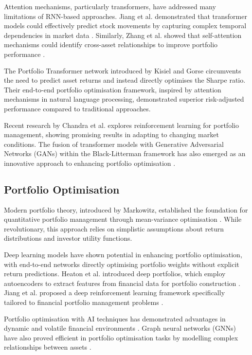 \documentclass[conference]{IEEEtran}
\begin{document}
Attention mechanisms, particularly transformers, have addressed many limitations of RNN-based approaches. Jiang et al. demonstrated that transformer models could effectively predict stock movements by capturing complex temporal dependencies in market data \cite{jiang2021stock}. Similarly, Zhang et al. showed that self-attention mechanisms could identify cross-asset relationships to improve portfolio performance \cite{zhang2018improving}.

The Portfolio Transformer network introduced by Kisiel and Gorse \cite{kisiel2023portfolio} circumvents the need to predict asset returns and instead directly optimises the Sharpe ratio. Their end-to-end portfolio optimisation framework, inspired by attention mechanisms in natural language processing, demonstrated superior risk-adjusted performance compared to traditional approaches.

Recent research by Chandra et al. \cite{chandra2023reinforcement} explores reinforcement learning for portfolio management, showing promising results in adapting to changing market conditions. The fusion of transformer models with Generative Adversarial Networks (GANs) within the Black-Litterman framework has also emerged as an innovative approach to enhancing portfolio optimisation \cite{agarwal2022enhancing}.

\subsection{Portfolio Optimisation}
Modern portfolio theory, introduced by Markowitz, established the foundation for quantitative portfolio management through mean-variance optimisation \cite{markowitz1952portfolio}. While revolutionary, this approach relies on simplistic assumptions about return distributions and investor utility functions.

Deep learning models have shown potential in enhancing portfolio optimisation, with end-to-end networks directly optimising portfolio weights without explicit return predictions. Heaton et al. introduced deep portfolios, which employ autoencoders to extract features from financial data for portfolio construction \cite{heaton2017deep}. Jiang et al. proposed a deep reinforcement learning framework specifically tailored to financial portfolio management problems \cite{jiang2017deep}.

Portfolio optimisation with AI techniques has demonstrated advantages in dynamic and volatile financial environments \cite{lonnrot2024portfolio}. Graph neural networks (GNNs) have also proved efficient in portfolio optimisation tasks by modelling complex relationships between assets \cite{cartanya2022deep}.
\end{document}
